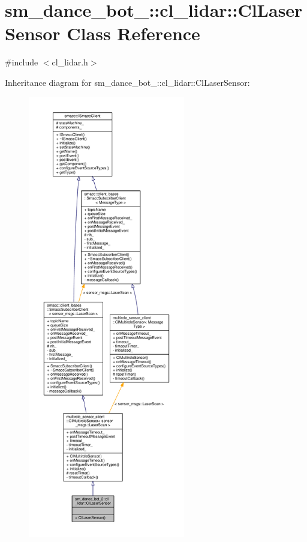 \hypertarget{classsm__dance__bot__2_1_1cl__lidar_1_1ClLaserSensor}{}\section{sm\+\_\+dance\+\_\+bot\+\_\+:\+:cl\+\_\+lidar\+:\+:Cl\+Laser\+Sensor Class Reference}
\label{classsm__dance__bot__2_1_1cl__lidar_1_1ClLaserSensor}


{\ttfamily \#include $<$cl\+\_\+lidar.\+h$>$}



Inheritance diagram for sm\+\_\+dance\+\_\+bot\+\_\+:\+:cl\+\_\+lidar\+:\+:Cl\+Laser\+Sensor\+:\nopagebreak
\begin{figure}[H]
\begin{center}
\leavevmode
\includegraphics[height=550pt]{classsm__dance__bot__2_1_1cl__lidar_1_1ClLaserSensor__inherit__graph}
\end{center}
\end{figure}


